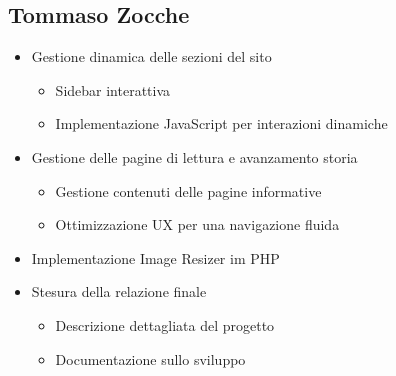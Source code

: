 \subsection{Tommaso Zocche}
\begin{itemize}
    \item Gestione dinamica delle sezioni del sito
    \begin{itemize}
        \item Sidebar interattiva
        \item Implementazione JavaScript per interazioni dinamiche
    \end{itemize}
    \item Gestione delle pagine di lettura e avanzamento storia
    \begin{itemize}
        \item Gestione contenuti delle pagine informative
        \item Ottimizzazione UX per una navigazione fluida
    \end{itemize}
    \item Implementazione Image Resizer im PHP
    \item Stesura della relazione finale
    \begin{itemize}
        \item Descrizione dettagliata del progetto
        \item Documentazione sullo sviluppo
    \end{itemize}
\end{itemize}
